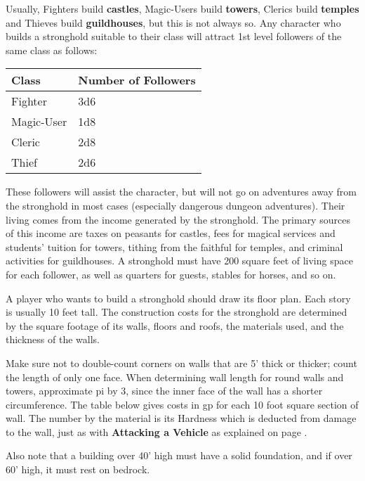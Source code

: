 \documentclass[a4paper,twoside,openany,10pt]{book}
\begin{document}
\begin{multicols}{2}
Usually, Fighters build \textbf{castles}, Magic-Users build \textbf{towers}, Clerics build \textbf{temples} and Thieves build \textbf{guildhouses}, but this is not always so. Any character who builds a stronghold suitable to their class will attract 1st level followers of the same class as follows:\medskip

\begin{tabular*}{0.93\linewidth}{@{\extracolsep{\fill}}ll}
\textbf{Class} & \textbf{Number of Followers} \\\toprule
Fighter & 3d6 \\\hline
Magic-User & 1d8 \\\hline
Cleric & 2d8 \\\hline
Thief & 2d6 \\\bottomrule
\end{tabular*}\medskip

These followers will assist the character, but will not go on adventures away from the stronghold in most cases (especially dangerous dungeon adventures). Their living comes from the income generated by the stronghold. The primary sources of this income are taxes on peasants for castles, fees for magical services and students' tuition for towers, tithing from the faithful for temples, and criminal activities for guildhouses. A stronghold must have 200 square feet of living space for each follower, as well as quarters for guests, stables for horses, and so on.

A player who wants to build a stronghold should draw its floor plan. Each story is usually 10 feet tall. The construction costs for the stronghold are determined by the square footage of its walls, floors and roofs, the materials used, and the thickness of the walls.

Make sure not to double-count corners on walls that are 5' thick or thicker; count the length of only one face. When determining wall length for round walls and towers, approximate pi by 3, since the inner face of the wall has a shorter circumference. The table below gives costs in gp for each 10 foot square section of wall. The number by the material is its Hardness which is deducted from damage to the wall, just as with \textbf{Attacking a Vehicle} as explained on page \hyperlink{attacking-a-vehicle}{\pageref{attacking-a-vehicle}}.

Also note that a building over 40' high must have a solid foundation, and if over 60' high, it must rest on bedrock.\medskip


\end{multicols}
\end{document}
